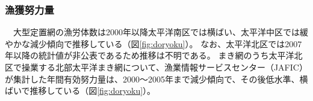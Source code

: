 \subsubsection{漁獲努力量}
　大型定置網の漁労体数は2000年以降太平洋南区では横ばい、太平洋中区では緩やかな減少傾向で推移している（図\ref{fig:doryoku}）。
なお、太平洋北区では2007年以降の統計値が非公表であるため推移は不明である。
まき網のうち太平洋北区で操業する北部太平洋まき網について、漁業情報サービスセンター（JAFIC）が集計した年間有効努力量は、2000～2005年まで減少傾向で、その後低水準、横ばいで推移している（図\ref{fig:doryoku}）。

